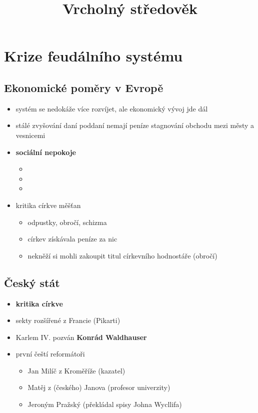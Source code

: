 \title{Vrcholný středověk}




\section{Krize feudálního systému}
\subsection{Ekonomické poměry v Evropě}
\begin{itemize}
\item systém se nedokáže více rozvíjet, ale ekonomický vývoj jde dál
\item stálé zvyšování daní \ra poddaní nemají peníze \ra stagnování obchodu mezi městy a vesnicemi
\item[\ra] \textbf{sociální nepokoje}
	\begin{itemize}
	\item {}
	\item {}
	\item {}
	\end{itemize}
\item kritika církve měšťan
	\begin{itemize}
	\item odpustky, obročí, schizma
	\item církev získávala peníze za nic
	\item nekněží si mohli zakoupit titul církevního hodnostáře (obročí)
	\end{itemize}
\end{itemize}

\subsection{Český stát}
\begin{itemize}
\item \textbf{kritika církve}
\item sekty rozšířené z Francie (Pikarti)
\item Karlem IV. pozván \textbf{Konrád Waldhauser}
\item první čeští reformátoři
	\begin{itemize}
	\item Jan Milíč z Kroměříže (kazatel)
	\item Matěj z (českého) Janova (profesor univerzity)
	\item Jeroným Pražský (překládal spisy Johna Wycllifa)
	\end{itemize}
\end{itemize}

